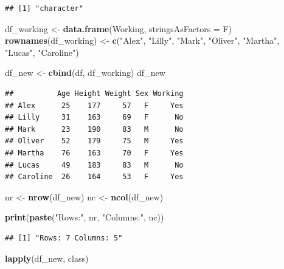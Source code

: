 \documentclass[]{article}
\newenvironment{Shaded}{\begin{snugshade}}{\end{snugshade}}
\newcommand{\DataTypeTok}[1]{\textcolor[rgb]{0.13,0.29,0.53}{#1}}
\newcommand{\KeywordTok}[1]{\textcolor[rgb]{0.13,0.29,0.53}{\textbf{#1}}}
\newcommand{\NormalTok}[1]{#1}
\newcommand{\StringTok}[1]{\textcolor[rgb]{0.31,0.60,0.02}{#1}}
\begin{document}
\begin{verbatim}
## [1] "character"
\end{verbatim}

\begin{Shaded}
\begin{Highlighting}[]
\NormalTok{df_working <-}\StringTok{ }\KeywordTok{data.frame}\NormalTok{(Working, }\DataTypeTok{stringsAsFactors =}\NormalTok{ F)}
\KeywordTok{rownames}\NormalTok{(df_working) <-}\StringTok{ }\KeywordTok{c}\NormalTok{(}\StringTok{"Alex"}\NormalTok{, }\StringTok{"Lilly"}\NormalTok{, }\StringTok{"Mark"}\NormalTok{, }\StringTok{"Oliver"}\NormalTok{, }\StringTok{"Martha"}\NormalTok{, }\StringTok{"Lucas"}\NormalTok{, }\StringTok{"Caroline"}\NormalTok{)}


\NormalTok{df_new <-}\StringTok{ }\KeywordTok{cbind}\NormalTok{(df, df_working)}
\NormalTok{df_new}
\end{Highlighting}
\end{Shaded}

\begin{verbatim}
##          Age Height Weight Sex Working
## Alex      25    177     57   F     Yes
## Lilly     31    163     69   F      No
## Mark      23    190     83   M      No
## Oliver    52    179     75   M     Yes
## Martha    76    163     70   F     Yes
## Lucas     49    183     83   M      No
## Caroline  26    164     53   F     Yes
\end{verbatim}

\begin{Shaded}
\begin{Highlighting}[]
\NormalTok{nr <-}\StringTok{ }\KeywordTok{nrow}\NormalTok{(df_new)}
\NormalTok{nc <-}\StringTok{ }\KeywordTok{ncol}\NormalTok{(df_new)}

\KeywordTok{print}\NormalTok{(}\KeywordTok{paste}\NormalTok{(}\StringTok{"Rows:"}\NormalTok{, nr, }\StringTok{"Columns:"}\NormalTok{, nc))}
\end{Highlighting}
\end{Shaded}

\begin{verbatim}
## [1] "Rows: 7 Columns: 5"
\end{verbatim}

\begin{Shaded}
\begin{Highlighting}[]
\KeywordTok{lapply}\NormalTok{(df_new, class)}
\end{Highlighting}
\end{Shaded}
\end{document}
